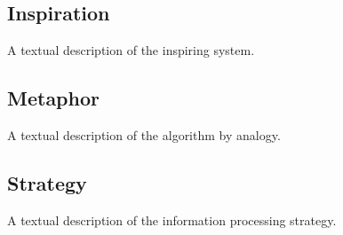 \subsection{Inspiration}
A textual description of the inspiring system.

\subsection{Metaphor}
A textual description of the algorithm by analogy.

\subsection{Strategy}
A textual description of the information processing strategy.

